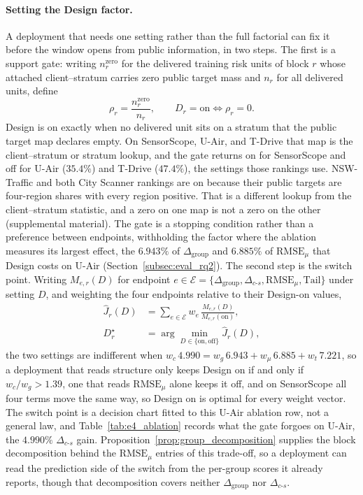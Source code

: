 \documentclass[letterpaper,journal]{IEEEtran}
\begin{document}
\paragraph{Setting the Design factor.}
A deployment that needs one setting rather than the full factorial can fix it
before the window opens from public information, in two steps.  The first is a
support gate: writing $n^{\mathrm{zero}}_r$ for the delivered training risk units
of block $r$ whose attached client--stratum carries zero public target mass and
$n_r$ for all delivered units, define
\begin{equation}
\rho_r=\frac{n^{\mathrm{zero}}_r}{n_r},
\qquad
D_r=\mathrm{on}\iff\rho_r=0 .
\label{eq:design_gate}
\end{equation}
Design is on exactly when no delivered unit sits on a stratum that the public
target map declares empty.  On SensorScope, U-Air, and T-Drive that map is the
client--stratum or stratum lookup, and the gate returns on for SensorScope and
off for U-Air ($35.4\%$) and T-Drive ($47.4\%$), the settings those rankings use.
NSW-Traffic and both City Scanner rankings are on because their public targets
are four-region shares with every region positive.  That is a different lookup
from the client--stratum statistic, and a zero on one map is not a zero on the
other (supplemental material).  The gate is
a stopping condition rather than a preference between endpoints, withholding the
factor where the ablation measures its largest effect, the $6.943\%$ of
$\Delta_{\mathrm{group}}$ and $6.885\%$ of $\mathrm{RMSE}_{\mu}$ that Design costs
on U-Air (Section~\ref{subsec:eval_rq2}).  The second step is the switch point.
Writing $M_{e,r}(D)$ for endpoint
$e\in\mathcal{E}=\{\Delta_{\mathrm{group}},\Delta_{c\text{-}s},
\mathrm{RMSE}_{\mu},\mathrm{Tail}\}$ under setting $D$, and weighting the four
endpoints relative to their Design-on values,
\begin{equation}
\begin{aligned}
\widehat J_r(D)&=\sum_{e\in\mathcal{E}}w_e\,\frac{M_{e,r}(D)}{M_{e,r}(\mathrm{on})},\\
D_r^{\star}&=\arg\min_{D\in\{\mathrm{on},\mathrm{off}\}}\widehat J_r(D),
\end{aligned}
\label{eq:design_switch}
\end{equation}
the two settings are indifferent when
$w_c\,4.990=w_g\,6.943+w_\mu\,6.885+w_t\,7.221$, so a deployment that reads
structure only keeps Design on if and only if $w_c/w_g>1.39$, one that reads
$\mathrm{RMSE}_{\mu}$ alone keeps it off, and on SensorScope all four terms move
the same way, so Design on is optimal for every weight vector.  The switch point
is a decision chart fitted to this U-Air ablation row, not a general law, and
Table~\ref{tab:e4_ablation} records what the gate forgoes on U-Air, the $4.990\%$
$\Delta_{c\text{-}s}$ gain.  Proposition~\ref{prop:group_decomposition} supplies
the block decomposition behind the $\mathrm{RMSE}_{\mu}$ entries of this
trade-off, so a deployment can read the prediction side of the switch from the
per-group scores it already reports, though that decomposition covers neither
$\Delta_{\mathrm{group}}$ nor $\Delta_{c\text{-}s}$.
\end{document}
